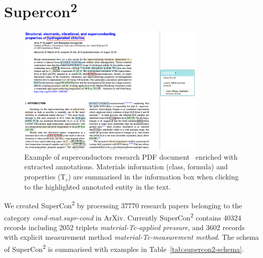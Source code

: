 \documentclass[]{interact}
\theoremstyle{plain}%
\theoremstyle{definition}
\theoremstyle{remark}
\newcommand{\tc}{T$_{c}$}
\begin{document}
\section{Supercon\textsuperscript{2}}

\begin{figure}[ht!]
    \centering
    \includegraphics[width=0.8\textwidth]{sample-pdf-annotations}
    \caption{\label{fig:pdf-annotations} Example of superconductors research PDF document~\cite{sample_superconductors_article} enriched with extracted annotations. Materials information (class, formula) and properties (\tc) are summarised in the information box when clicking to the highlighted annotated entity in the text.}
\end{figure}

We created SuperCon\textsuperscript{2} by processing 37770 research papers belonging to the category \textit{cond-mat.supr-cond} in ArXiv.
Currently SuperCon\textsuperscript{2} contains 40324 records including 2052 triplets \textit{material-Tc-applied pressure}, and 3602 records with explicit measurement method \textit{material-Tc-measurement method}.
The schema of SuperCon\textsuperscript{2} is summarised with examples in Table~\ref{tab:supercon2-schema}.
\end{document}
